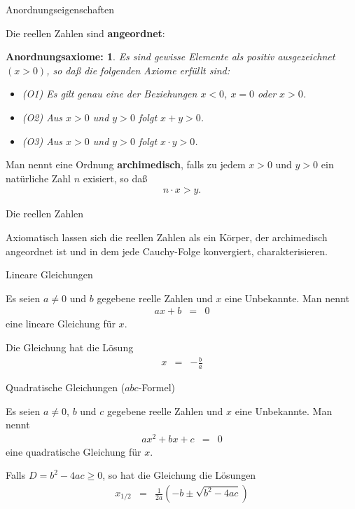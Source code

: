 \documentclass[german]{beamer}
\newcommand{\bq}{\begin{eqnarray*}}
\newcommand{\eq}{\end{eqnarray*}}
\newtheorem*{mytheorem5}{{\bf Anordnungsaxiome}:}
\begin{document}
\begin{frame}{Anordnungseigenschaften}

Die reellen Zahlen sind {\bf angeordnet}:
\begin{mytheorem5}
Es sind gewisse Elemente als positiv ausgezeichnet $(x>0)$, so da{\ss} die folgenden Axiome erf\"ullt sind:
\begin{itemize}
\item (O1) Es gilt genau eine der Beziehungen $x<0$, $x=0$ oder $x>0$.
\item (O2) Aus $x>0$ und $y>0$ folgt $x+y>0$.
\item (O3) Aus $x>0$ und $y>0$ folgt $x \cdot y >0$.
\end{itemize}
\end{mytheorem5}

Man nennt eine Ordnung {\bf archimedisch}, falls zu jedem $x>0$ und $y>0$ ein nat\"urliche Zahl $n$ exisiert,
so da{\ss}
\bq
n \cdot x > y.
\eq

\end{frame}

\begin{frame}{Die reellen Zahlen}

Axiomatisch lassen sich die reellen Zahlen als ein K\"orper, der archimedisch angeordnet ist und in dem jede
Cauchy-Folge konvergiert, charakterisieren.

\end{frame}

\begin{frame}{Lineare Gleichungen}

Es seien $a \neq 0$ und $b$ gegebene reelle Zahlen und $x$ eine Unbekannte.
Man nennt
\bq
 a x + b & = & 0
\eq
eine \alert{lineare Gleichung} f\"ur $x$.

\vspace*{3mm} 
Die Gleichung hat die L\"osung
\bq
 x & = & - \frac{b}{a}
\eq

\end{frame}

\begin{frame}{Quadratische Gleichungen ($a b c$-Formel)}

Es seien $a \neq 0$, $b$ und $c$ gegebene reelle Zahlen und $x$ eine Unbekannte.
Man nennt
\bq
 a x^2 + b x + c & = & 0
\eq
eine \alert{quadratische Gleichung} f\"ur $x$.

Falls $D=b^2-4ac \ge 0$, so hat die Gleichung die L\"osungen 
\bq
 x_{1/2}
 & = &
 \frac{1}{2a} \left( -b \pm \sqrt{b^2 -4 a c} \right)
\eq

\end{frame}
\end{document}
